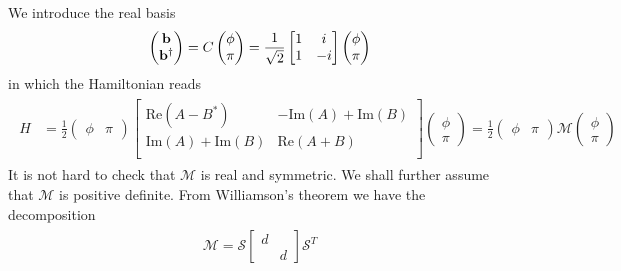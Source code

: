 We introduce the real basis 
\begin{eqnarray}\begin{aligned}
\label{eq:real_basis}
\begin{pmatrix}
{\bf b}\\
{\bf b}^\dagger
\end{pmatrix}
=C\begin{pmatrix}
\phi\\
\pi
\end{pmatrix}
=\frac{1}{\sqrt{2}}\begin{bmatrix}
1 & i \\
1 & -i
\end{bmatrix}\begin{pmatrix}
\phi\\
\pi
\end{pmatrix}
\end{aligned}\end{eqnarray}
in which the Hamiltonian reads
\begin{eqnarray}\begin{aligned}
\hat{H}
&=\frac{1}{2}
\begin{pmatrix}
\phi & \pi
\end{pmatrix}
\begin{bmatrix}
\text{Re}(A-B^*) & -\text{Im}(A)+\text{Im}(B)\\
\text{Im}(A)+\text{Im}(B)& \text{Re}(A+B) \\
\end{bmatrix}
\begin{pmatrix}
\phi\\
\pi
\end{pmatrix}
=\frac{1}{2}
\begin{pmatrix}
\phi & \pi
\end{pmatrix}
\mathcal{M}
\begin{pmatrix}
\phi\\
\pi
\end{pmatrix}
\end{aligned}\end{eqnarray}
It is not hard to check that $\mathcal{M}$ is real and symmetric. We shall further assume that $\mathcal{M}$ is positive definite. From Williamson's theorem\cite{arnold_mathematical_2010,xiao_theory_2009,pirandola_correlation_2009,gosson_symplectic_2006} we have the decomposition
\begin{eqnarray}\begin{aligned}
\mathcal{M}=\mathcal{S}
\begin{bmatrix}
d\\
&d
\end{bmatrix}
\mathcal{S}^T
\end{aligned}\end{eqnarray}
